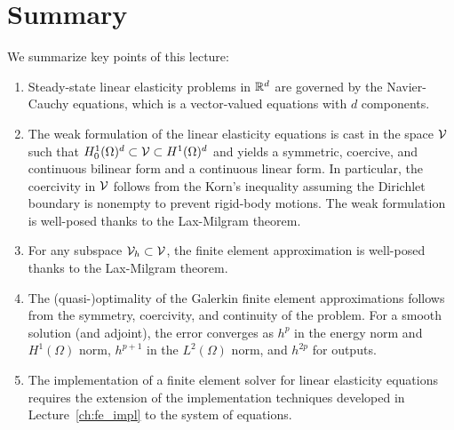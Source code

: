 \section{Summary}
We summarize key points of this lecture:
\begin{enumerate}
\item Steady-state linear elasticity problems in $\mathbb{R}^d$ are governed by the Navier-Cauchy equations, which is a vector-valued equations with $d$ components.
\item The weak formulation of the linear elasticity equations is cast in the space $\mathcal{V}$ such that $H^1_0(\Omega)^d \subset \mathcal{V} \subset H^1(\Omega)^d$ and yields a symmetric, coercive, and continuous bilinear form and a continuous linear form.  In particular, the coercivity in $\mathcal{V}$ follows from the Korn's inequality assuming the Dirichlet boundary is nonempty to prevent rigid-body motions.  The weak formulation is well-posed thanks to the Lax-Milgram theorem.
\item For any subspace $\mathcal{V}_h \subset \mathcal{V}$, the finite element approximation is well-posed thanks to the Lax-Milgram theorem.
\item The (quasi-)optimality of the Galerkin finite element approximations follows from the symmetry, coercivity, and continuity of the problem. For a smooth solution (and adjoint), the error converges as $h^p$ in the energy norm and $H^1(\Omega)$ norm, $h^{p+1}$ in the $L^2(\Omega)$ norm, and $h^{2p}$ for outputs.
\item The implementation of a finite element solver for linear elasticity equations requires the extension of the implementation techniques developed in Lecture~\ref{ch:fe_impl} to the system of equations.
\end{enumerate}


